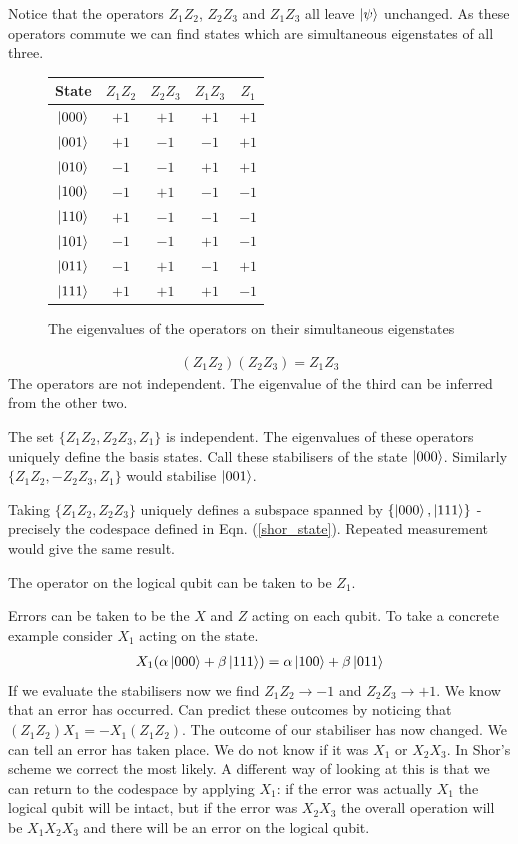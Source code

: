 Notice that the operators $Z_1 Z_2$, $Z_2 Z_3$ and $Z_1 Z_3$ all leave $\left\vert\psi\right\rangle$ unchanged. As these operators commute we can find states which are simultaneous eigenstates of all three. 
\begin{figure}\label{ops_states}
  \begin{center}
    \begin{tabular}{c c c c c}
      State & $Z_1 Z_2$ & $Z_2 Z_3$ & $Z_1 Z_3$ & $Z_1$ \\
      \hline
      $\left\vert000\right\rangle$ & $+1$ & $+1$ & $+1$ & $+1$ \\
      $\left\vert001\right\rangle$ & $+1$ & $-1$ & $-1$ & $+1$ \\
      $\left\vert010\right\rangle$ & $-1$ & $-1$ & $+1$ & $+1$ \\
      $\left\vert100\right\rangle$ & $-1$ & $+1$ & $-1$ & $-1$ \\
      $\left\vert110\right\rangle$ & $+1$ & $-1$ & $-1$ & $-1$ \\
      $\left\vert101\right\rangle$ & $-1$ & $-1$ & $+1$ & $-1$ \\
      $\left\vert011\right\rangle$ & $-1$ & $+1$ & $-1$ & $+1$ \\
      $\left\vert111\right\rangle$ & $+1$ & $+1$ & $+1$ & $-1$
    \end{tabular}
  \end{center}
  \caption{The eigenvalues of the operators on their simultaneous eigenstates}
\end{figure}

\begin{align}
  (Z_1Z_2)(Z_2Z_3) = Z_1Z_3
\end{align}
The operators are not independent. The eigenvalue of the third can be inferred from the other two.

The set $\{Z_1Z_2, Z_2Z_3, Z_1\}$ is independent. The eigenvalues of these operators uniquely define the basis states. Call these stabilisers of the state $\left\vert000\right\rangle$. Similarly $\{Z_1Z_2, -Z_2Z_3, Z_1\}$ would stabilise $\left\vert001\right\rangle$.

Taking $\{Z_1Z_2, Z_2Z_3\}$ uniquely defines a subspace spanned by $\{\left\vert000\right\rangle, \left\vert111\right\rangle\}$ - precisely the codespace defined in Eqn. (\ref{shor_state}). Repeated measurement would give the same result.


The operator on the logical qubit can be taken to be $Z_1$. 

Errors can be taken to be the $X$ and $Z$ acting on each qubit. To take a concrete example consider $X_1$ acting on the state.
\begin{align}
  X_1 (\alpha\left\vert000\right\rangle + \beta\left\vert111\right\rangle) = \alpha\left\vert100\right\rangle + \beta\left\vert011\right\rangle
\end{align}
If we evaluate the stabilisers now we find $Z_1Z_2 \rightarrow -1$ and $Z_2 Z_3 \rightarrow +1$. We know that an error has occurred. Can predict these outcomes by noticing that $(Z_1Z_2)X_1 = -X_1(Z_1Z_2)$. The outcome of our stabiliser has now changed. We can tell an error has taken place. We do not know if it was $X_1$ or $X_2X_3$. In Shor's scheme we correct the most likely. A different way of looking at this is that we can return to the codespace by applying $X_1$: if the error was actually $X_1$ the logical qubit will be intact, but if the error was $X_2X_3$ the overall operation will be $X_1X_2X_3$ and there will be an error on the logical qubit.


